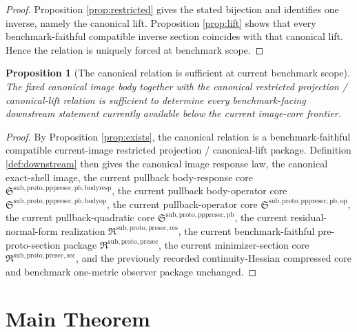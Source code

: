 \documentclass[11pt]{article}
\newcommand{\PrePreProtoSectionPullbackCore}{\mathfrak S^{\mathrm{sub,proto,pppresec,pb}}}
\newcommand{\PullbackOperatorCore}{\mathfrak S^{\mathrm{sub,proto,pppresec,pb,op}}}
\newcommand{\PullbackBodyOperatorCore}{\mathfrak S^{\mathrm{sub,proto,pppresec,pb,bodyop}}}
\newcommand{\PullbackBodyResponseCore}{\mathfrak S^{\mathrm{sub,proto,pppresec,pb,bodyresp}}}
\newcommand{\PreProtoSectionResidualPackage}{\mathfrak R^{\mathrm{sub,proto,presec,res}}}
\newcommand{\PreProtoSectionPackage}{\mathfrak R^{\mathrm{sub,proto,presec}}}
\newcommand{\PreProtoSectionMinSectionCore}{\mathfrak R^{\mathrm{sub,proto,presec,sec}}}
\newtheorem{proposition}{Proposition}
\begin{document}
\begin{proof}
Proposition \ref{prop:restricted} gives the stated bijection and identifies one inverse, namely the canonical lift. Proposition \ref{prop:lift} shows that every benchmark-faithful compatible inverse section coincides with that canonical lift. Hence the relation is uniquely forced at benchmark scope.
\end{proof}

\begin{proposition}[The canonical relation is sufficient at current benchmark scope]
\label{prop:sufficient}
The fixed canonical image body together with the canonical restricted projection / canonical-lift relation is sufficient to determine every benchmark-facing downstream statement currently available below the current image-core frontier.
\end{proposition}

\begin{proof}
By Proposition \ref{prop:exists}, the canonical relation is a benchmark-faithful compatible current-image restricted projection / canonical-lift package. Definition \ref{def:downstream} then gives the canonical image response law, the canonical exact-shell image, the current pullback body-response core \(\PullbackBodyResponseCore\), the current pullback body-operator core \(\PullbackBodyOperatorCore\), the current pullback-operator core \(\PullbackOperatorCore\), the current pullback-quadratic core \(\PrePreProtoSectionPullbackCore\), the current residual-normal-form realization \(\PreProtoSectionResidualPackage\), the current benchmark-faithful pre-proto-section package \(\PreProtoSectionPackage\), the current minimizer-section core \(\PreProtoSectionMinSectionCore\), and the previously recorded continuity-Hessian compressed core and benchmark one-metric observer package unchanged.
\end{proof}

\section{Main Theorem}
\end{document}
